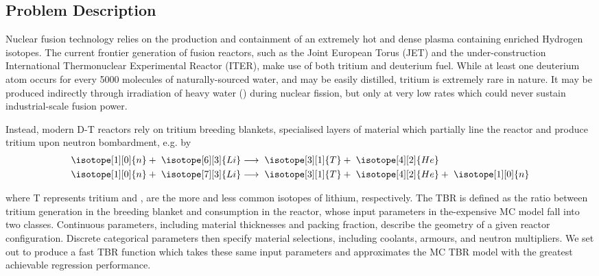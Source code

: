 \subsection{Problem Description}
\label{sec:problemdescription}

Nuclear fusion technology relies on the production and containment of an
extremely hot and dense plasma containing enriched Hydrogen isotopes. The current frontier generation of fusion reactors, such as the Joint European Torus (JET) and the
under-construction International Thermonuclear Experimental Reactor (ITER), make
use of both tritium and deuterium fuel. While at least one deuterium atom occurs for every \num{5000} molecules of naturally-sourced water, and may be easily distilled, tritium is extremely rare in nature. It may be produced indirectly through irradiation of heavy water
(\DDO) during nuclear fission, but only at very low rates which could
never sustain industrial-scale fusion power.

Instead, modern D-T reactors rely on tritium breeding blankets, specialised
layers of material which partially line the reactor and produce tritium upon
neutron bombardment, e.g. by 
\begin{eqnarray}
	\isotope[1][0]{n} + \hspace{3pt} \isotope[6][3]{Li} 
	&\longrightarrow \hspace{3pt} 
	\isotope[3][1]{T} + \hspace{3pt}\isotope[4][2]{He} \\
	\isotope[1][0]{n} + \hspace{3pt} \isotope[7][3]{Li} 
	&\longrightarrow \hspace{3pt} 
	\isotope[3][1]{T} + \hspace{3pt} \isotope[4][2]{He} + \hspace{3pt} \isotope[1][0]{n}
\end{eqnarray}

where T represents tritium and ,  are the more and
less common isotopes of lithium, respectively. The TBR is defined as the ratio between tritium generation in the breeding blanket and consumption in the reactor, whose input parameters in the-expensive MC model fall
into two classes. Continuous parameters, including material thicknesses and
packing fraction, describe the geometry of a given reactor configuration.
 Discrete
categorical parameters then specify material selections, including
coolants, armours, and neutron multipliers. We set out to produce a fast TBR
function which takes these same input parameters and approximates the MC TBR
model with the greatest achievable regression performance.

